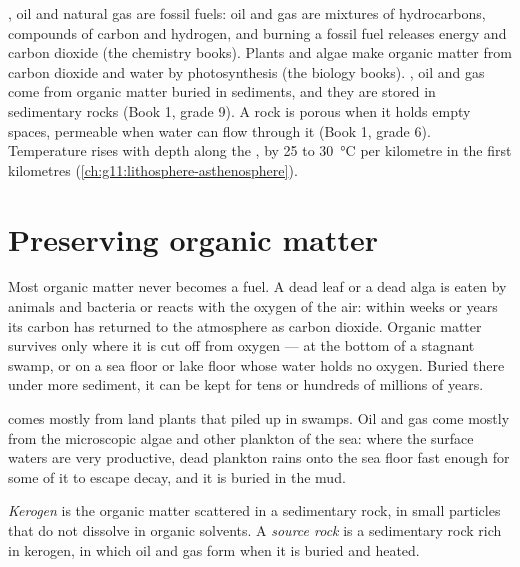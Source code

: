 \begin{recall}
, oil and natural gas are fossil fuels: oil and gas are mixtures of
hydrocarbons, compounds of carbon and hydrogen, and burning a fossil fuel
releases energy and carbon dioxide (the chemistry books). Plants and algae
make organic matter from carbon dioxide and water by photosynthesis (the
biology books). , oil and gas come from organic matter buried in
sediments, and they are stored in sedimentary rocks (Book 1, grade 9). A rock
is porous when it holds empty spaces, permeable when water can flow through
it (Book 1, grade 6). Temperature rises with depth along the ,
by 25 to \qty{30}{\degreeCelsius} per kilometre in the first kilometres
(\cref{ch:g11:lithosphere-asthenosphere}).
\end{recall}

\section{Preserving organic matter}

Most organic matter never becomes a fuel. A dead leaf or a dead alga is
eaten by animals and bacteria or reacts with the oxygen of the air: within
weeks or years its carbon has returned to the atmosphere as carbon dioxide.
Organic matter survives only where it is cut off from oxygen --- at the
bottom of a stagnant swamp, or on a sea floor or lake floor whose water holds
no oxygen. Buried there under more sediment, it can be kept for tens or
hundreds of millions of years.

 comes mostly from land plants that piled up in swamps. Oil and gas come
mostly from the microscopic algae and other plankton of the sea: where the
surface waters are very productive, dead plankton rains onto the sea floor
fast enough for some of it to escape decay, and it is buried in the mud.

\begin{definition}\label{def:g11:fossil-fuel-geology:source-rock}
\emph{Kerogen} is the organic matter scattered in a
sedimentary rock, in small particles that do not dissolve in organic
solvents. A \emph{source rock} is a sedimentary rock rich
in kerogen, in which oil and gas form when it is buried and heated.
\end{definition}

